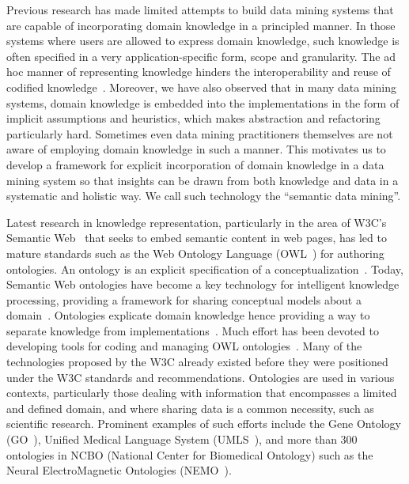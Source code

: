 Previous research has made limited attempts to build data mining systems that are capable of incorporating domain knowledge in a principled manner. In those systems where users are allowed to express domain knowledge, such knowledge is often specified in a very application-specific form, scope and granularity. The ad hoc manner of representing knowledge hinders the interoperability and reuse of codified knowledge~\cite{Pohle03}. Moreover, we have also observed that in many data mining systems, domain knowledge is embedded into the implementations in the form of implicit assumptions and heuristics, which makes abstraction and refactoring particularly hard. Sometimes even data mining practitioners themselves are not aware of employing domain knowledge in such a manner. This motivates us to develop a framework for explicit incorporation of domain knowledge in a data mining system so that insights can be drawn from both knowledge and data in a systematic and holistic way. We call such technology the ``semantic data mining''.

Latest research in knowledge representation, particularly in the area of W3C's Semantic Web~\cite{Berners-Lee01} that seeks to embed semantic content in web pages, has led to mature standards such as the Web Ontology Language (OWL~\cite{OWL}) for authoring ontologies. An ontology is an explicit specification of a conceptualization~\cite{Gruber93}. Today, Semantic Web ontologies have become a key technology for intelligent knowledge processing, providing a framework for sharing conceptual models about a domain~\cite{Maedche03Onto}. Ontologies explicate domain knowledge hence providing a way to separate knowledge from implementations~\cite{Noy01ontologydevelopment}. Much effort has been devoted to developing tools for coding and managing OWL ontologies~\cite{Duineveld00, Knublauch04}. Many of the technologies proposed by the W3C already existed before they were positioned under the W3C standards and recommendations. Ontologies are used in various contexts, particularly those dealing with information that encompasses a limited and defined domain, and where sharing data is a common necessity, such as scientific research. Prominent examples of such efforts include the Gene Ontology (GO~\cite{GO}), Unified Medical Language System (UMLS~\cite{UMLS}), and more than 300 ontologies in NCBO (National Center for Biomedical Ontology) such as the Neural ElectroMagnetic Ontologies (NEMO~\cite{FrishkoffEtal07, FrishkoffEtal09}).

